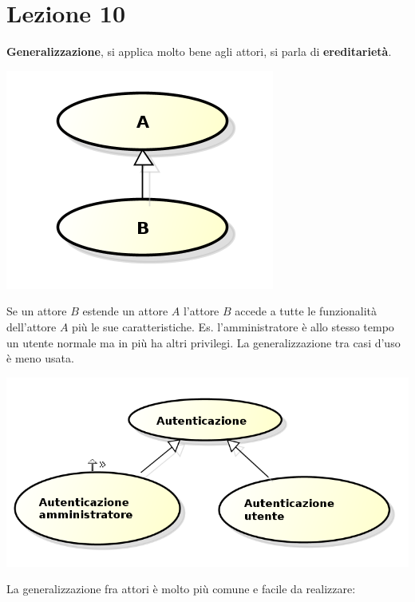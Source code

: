 \section{Lezione 10}

\textbf{Generalizzazione}, si applica molto bene agli attori, si parla di \textbf{ereditarietà}.

\begin{center}

\includegraphics[width=0.75\columnwidth]{img1} %

\end{center}

Se un attore $B$ estende un attore $A$ l'attore $B$ accede a tutte le funzionalità dell'attore $A$ più le sue caratteristiche. Es. l'amministratore è allo stesso tempo un utente normale ma in più ha altri privilegi. La generalizzazione tra casi d'uso è meno usata.

\begin{center}

\includegraphics[width=0.75\columnwidth]{img2} %

\end{center}

La generalizzazione fra attori è molto più comune e facile da realizzare:

